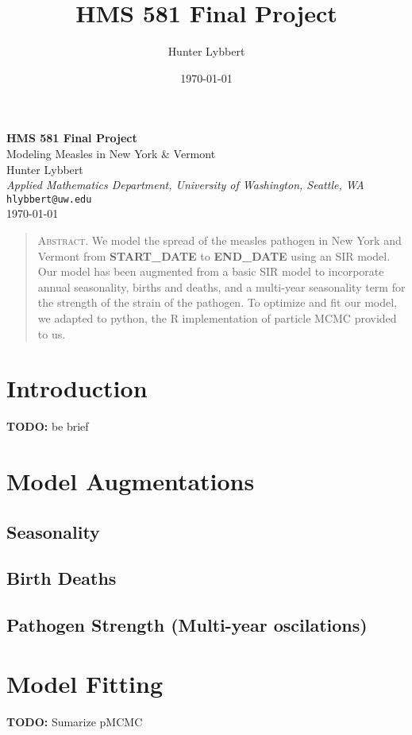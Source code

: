 \documentclass[11pt]{amsart}
\title{HMS 581 Final Project}
\author{Hunter Lybbert}
\date{\today}
\begin{document}
\begin{center}
    {\LARGE \textbf{HMS 581 Final Project}}\\[1ex]
    {\large Modeling Measles in New York \& Vermont}\\[4ex]
    {\Large Hunter Lybbert}\\[2ex]
    \textit{Applied Mathematics Department, University of Washington, Seattle, WA}\\[1ex]
    \texttt{hlybbert@uw.edu}\\[1ex]
    \today
\end{center}

\vspace{2ex}
\begin{quote}
A\textsc{bstract.}
\small We model the spread of the measles pathogen in New York and Vermont from \textbf{START\_DATE} to \textbf{END\_DATE} using an SIR model.
Our model has been augmented from a basic SIR model to incorporate annual seasonality, births and deaths, and a multi-year seasonality term for the strength of the strain of the pathogen.
To optimize and fit our model, we adapted to python, the R implementation of particle MCMC provided to us.
\end{quote}

\section{Introduction}\label{sec:Introduction}
\textbf{TODO:} be brief

\section{Model Augmentations}\label{sec:augmentations}
\subsection{Seasonality}
\subsection{Birth Deaths}
\subsection{Pathogen Strength (Multi-year oscilations)}

\section{Model Fitting}\label{sec:fitting}
\textbf{TODO:} Sumarize pMCMC
\end{document}
